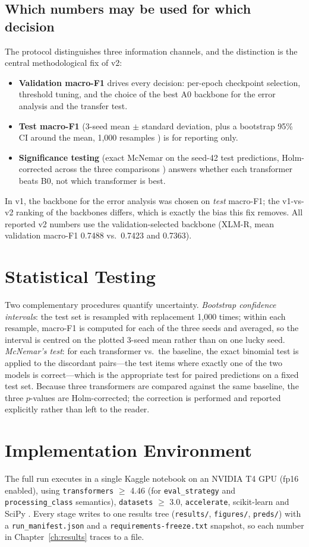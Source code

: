 \subsection{Which numbers may be used for which decision}
The protocol distinguishes three information channels, and the distinction is the
central methodological fix of v2:
\begin{itemize}
\item \textbf{Validation macro-F1} drives every decision: per-epoch checkpoint
selection, threshold tuning, and the choice of the best A0 backbone for the
error analysis and the transfer test.
\item \textbf{Test macro-F1} (3-seed mean $\pm$ standard deviation, plus a
bootstrap 95\% CI around the mean, 1{,}000 resamples \cite{bootstrap}) is for
reporting only.
\item \textbf{Significance testing} (exact McNemar \cite{mcnemar} on the seed-42
test predictions, Holm-corrected across the three comparisons \cite{holm})
answers whether each transformer beats B0, not which transformer is best.
\end{itemize}
In v1, the backbone for the error analysis was chosen on \emph{test} macro-F1; the
v1-vs-v2 ranking of the backbones differs, which is exactly the bias this fix
removes. All reported v2 numbers use the validation-selected backbone
(XLM-R, mean validation macro-F1 0.7488 vs.\ 0.7423 and 0.7363).

\section{Statistical Testing}
\label{sec:stats}

Two complementary procedures quantify uncertainty. \emph{Bootstrap confidence
intervals}: the test set is resampled with replacement 1{,}000 times; within each
resample, macro-F1 is computed for each of the three seeds and averaged, so the
interval is centred on the plotted 3-seed mean rather than on one lucky seed.
\emph{McNemar's test}: for each transformer vs.\ the baseline, the exact binomial
test is applied to the discordant pairs---the test items where exactly one of the
two models is correct---which is the appropriate test for paired predictions on a
fixed test set. Because three transformers are compared against the same baseline,
the three $p$-values are Holm-corrected; the correction is performed and reported
explicitly rather than left to the reader.

\section{Implementation Environment}
\label{sec:environment}

The full run executes in a single Kaggle notebook on an NVIDIA T4 GPU (fp16
enabled), using \texttt{transformers} $\geq$ 4.46 (for \texttt{eval\_strategy}
and \texttt{processing\_class} semantics), \texttt{datasets} $\geq$ 3.0,
\texttt{accelerate}, scikit-learn and SciPy \cite{transformers,sklearn}. Every
stage writes to one results tree (\texttt{results/}, \texttt{figures/},
\texttt{preds/}) with a \texttt{run\_manifest.json} and a
\texttt{requirements-freeze.txt} snapshot, so each number in
Chapter~\ref{ch:results} traces to a file.
